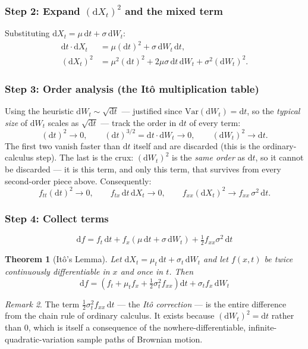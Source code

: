 \documentclass[11pt]{article}
\newtheorem{theorem}{Theorem}[section]
\theoremstyle{definition}
\theoremstyle{remark}
\newtheorem{remark}[theorem]{Remark}
\newcommand{\dd}{\mathrm{d}}
\newcommand{\Var}{\mathrm{Var}}
\begin{document}
\subsubsection*{Step 2: Expand $(\dd X_t)^2$ and the mixed term}

Substituting $\dd X_t = \mu\,\dd t + \sigma\,\dd W_t$:
\begin{align}
\dd t \cdot \dd X_t &= \mu (\dd t)^2 + \sigma \,\dd W_t\,\dd t, \\
(\dd X_t)^2 &= \mu^2(\dd t)^2 + 2\mu\sigma\,\dd t\,\dd W_t + \sigma^2(\dd W_t)^2.
\end{align}

\subsubsection*{Step 3: Order analysis (the Itô multiplication table)}

Using the heuristic $\dd W_t \sim \sqrt{\dd t}$ — justified since $\Var(\dd W_t) = \dd t$, so the
\emph{typical size} of $\dd W_t$ scales as $\sqrt{\dd t}$ — track the order in $\dd t$ of every term:
\[
(\dd t)^2 \to 0, \qquad (\dd t)^{3/2} = \dd t \cdot \dd W_t \to 0, \qquad (\dd W_t)^2 \to \dd t.
\]
The first two vanish faster than $\dd t$ itself and are discarded (this is the ordinary-calculus
step). The last is the crux: $(\dd W_t)^2$ is the \emph{same order} as $\dd t$, so it cannot be
discarded — it is this term, and only this term, that survives from every second-order piece above.
Consequently:
\[
f_{tt}(\dd t)^2 \to 0, \qquad f_{tx}\,\dd t\,\dd X_t \to 0, \qquad
f_{xx}(\dd X_t)^2 \to f_{xx}\,\sigma^2\,\dd t.
\]

\subsubsection*{Step 4: Collect terms}

\[
\dd f = f_t\,\dd t + f_x(\mu\,\dd t + \sigma\,\dd W_t) + \tfrac12 f_{xx}\sigma^2\,\dd t
\]

\begin{theorem}[Itô's Lemma]
\label{thm:ito}
Let $\dd X_t = \mu_t\,\dd t + \sigma_t\,\dd W_t$ and let $f(x,t)$ be twice continuously
differentiable in $x$ and once in $t$. Then
\[
\boxed{\ \dd f = \left(f_t + \mu_t f_x + \tfrac12 \sigma_t^2 f_{xx}\right)\dd t + \sigma_t f_x\,\dd W_t\ }
\]
\end{theorem}

\begin{remark}
The term $\tfrac12\sigma_t^2 f_{xx}\,\dd t$ — the \emph{Itô correction} — is the entire difference
from the chain rule of ordinary calculus. It exists because $(\dd W_t)^2 = \dd t$ rather than $0$,
which is itself a consequence of the nowhere-differentiable, infinite-quadratic-variation sample
paths of Brownian motion.
\end{remark}
\end{document}
